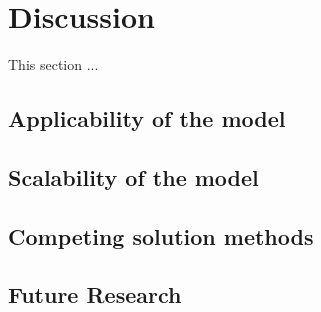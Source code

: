 \documentclass[11pt]{article}
\begin{document}
\fi

\section{Discussion} \label{Section: Discussion}
This section ...

\subsection{Applicability of the model} \label{Subsection: Applicability of the model}
\subsection{Scalability of the model} \label{Subsection: Scalability of the model}
\subsection{Competing solution methods} \label{Subsection: Competing solution methods}
\subsection{Future Research} \label{Subsection: Future Research}

\ifdefined\COMPILINGMAIN
\else
\end{document}
